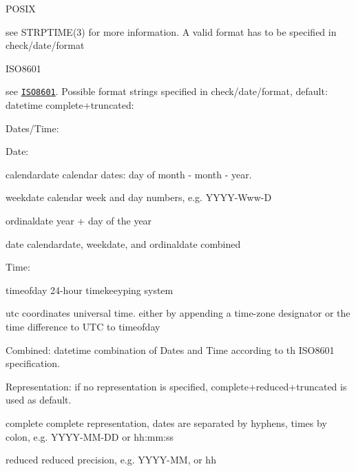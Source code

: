 \begin{DoxyItemize}
\item {\ttfamily P\+O\+S\+IX}

see {\ttfamily S\+T\+R\+P\+T\+I\+M\+E(3)} for more information. A valid format has to be specified in {\ttfamily check/date/format}
\item {\ttfamily I\+S\+O8601}

see \href{https://en.wikipedia.org/wiki/ISO_8601}{\tt I\+S\+O8601}. Possible format strings specified in {\ttfamily check/date/format}, default\+: {\ttfamily datetime complete+truncated}\+:
\begin{DoxyItemize}
\item Dates/\+Time\+:
\begin{DoxyItemize}
\item Date\+:
\begin{DoxyItemize}
\item {\ttfamily calendardate} calendar dates\+: day of month -\/ month -\/ year.
\item {\ttfamily weekdate} calendar week and day numbers, e.\+g. Y\+Y\+Y\+Y-\/\+Www-\/D
\item {\ttfamily ordinaldate} year + day of the year
\item {\ttfamily date} {\ttfamily calendardate}, {\ttfamily weekdate}, and {\ttfamily ordinaldate} combined
\end{DoxyItemize}
\item Time\+:
\begin{DoxyItemize}
\item {\ttfamily timeofday} 24-\/hour timekeeyping system
\item {\ttfamily utc} coordinates universal time. either by appending a time-\/zone designator or the time difference to {\ttfamily U\+TC} to {\ttfamily timeofday}
\end{DoxyItemize}
\item Combined\+: {\ttfamily datetime} combination of Dates and Time according to th I\+S\+O8601 specification.
\end{DoxyItemize}
\item Representation\+: if no representation is specified, {\ttfamily complete+reduced+truncated} is used as default.
\begin{DoxyItemize}
\item {\ttfamily complete} complete representation, dates are separated by hyphens, times by colon, e.\+g. Y\+Y\+Y\+Y-\/\+M\+M-\/\+DD or hh\+:mm\+:ss
\item {\ttfamily reduced} reduced precision, e.\+g. Y\+Y\+Y\+Y-\/\+MM, or hh

\end{DoxyItemize}
\end{DoxyItemize}
\end{DoxyItemize}
